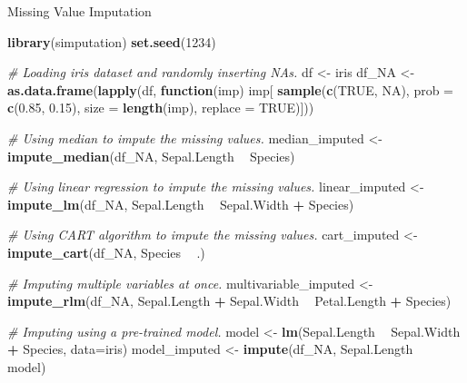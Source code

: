 \documentclass[12pt,ignorenonframetext,]{beamer}
\newenvironment{Shaded}{\begin{snugshade}}{\end{snugshade}}
\newcommand{\CommentTok}[1]{\textcolor[rgb]{0.56,0.35,0.01}{\textit{#1}}}
\newcommand{\ControlFlowTok}[1]{\textcolor[rgb]{0.13,0.29,0.53}{\textbf{#1}}}
\newcommand{\DataTypeTok}[1]{\textcolor[rgb]{0.13,0.29,0.53}{#1}}
\newcommand{\DecValTok}[1]{\textcolor[rgb]{0.00,0.00,0.81}{#1}}
\newcommand{\FloatTok}[1]{\textcolor[rgb]{0.00,0.00,0.81}{#1}}
\newcommand{\KeywordTok}[1]{\textcolor[rgb]{0.13,0.29,0.53}{\textbf{#1}}}
\newcommand{\NormalTok}[1]{#1}
\newcommand{\OperatorTok}[1]{\textcolor[rgb]{0.81,0.36,0.00}{\textbf{#1}}}
\newcommand{\OtherTok}[1]{\textcolor[rgb]{0.56,0.35,0.01}{#1}}
\newcommand{\StringTok}[1]{\textcolor[rgb]{0.31,0.60,0.02}{#1}}
\begin{document}
\begin{frame}[fragile]{Missing Value Imputation}
\protect\hypertarget{missing-value-imputation}{}

\tiny

\begin{Shaded}
\begin{Highlighting}[]
\KeywordTok{library}\NormalTok{(simputation)}
\KeywordTok{set.seed}\NormalTok{(}\DecValTok{1234}\NormalTok{)}

\CommentTok{# Loading iris dataset and randomly inserting NAs.}
\NormalTok{df <-}\StringTok{ }\NormalTok{iris}
\NormalTok{df_NA <-}\StringTok{ }\KeywordTok{as.data.frame}\NormalTok{(}\KeywordTok{lapply}\NormalTok{(df, }\ControlFlowTok{function}\NormalTok{(imp) imp[ }\KeywordTok{sample}\NormalTok{(}\KeywordTok{c}\NormalTok{(}\OtherTok{TRUE}\NormalTok{, }\OtherTok{NA}\NormalTok{), }
        \DataTypeTok{prob =} \KeywordTok{c}\NormalTok{(}\FloatTok{0.85}\NormalTok{, }\FloatTok{0.15}\NormalTok{), }\DataTypeTok{size =} \KeywordTok{length}\NormalTok{(imp), }\DataTypeTok{replace =} \OtherTok{TRUE}\NormalTok{)]))}

\CommentTok{# Using median to impute the missing values.}
\NormalTok{median_imputed <-}\StringTok{ }\KeywordTok{impute_median}\NormalTok{(df_NA, }
\NormalTok{                                Sepal.Length }\OperatorTok{~}\StringTok{ }\NormalTok{Species)}

\CommentTok{# Using linear regression to impute the missing values.}
\NormalTok{linear_imputed <-}\StringTok{ }\KeywordTok{impute_lm}\NormalTok{(df_NA, Sepal.Length }\OperatorTok{~}\StringTok{ }\NormalTok{Sepal.Width }\OperatorTok{+}\StringTok{ }\NormalTok{Species)}

\CommentTok{# Using CART algorithm to impute the missing values.}
\NormalTok{cart_imputed <-}\StringTok{ }\KeywordTok{impute_cart}\NormalTok{(df_NA, Species }\OperatorTok{~}\StringTok{ }\NormalTok{.)}

\CommentTok{# Imputing multiple variables at once.}
\NormalTok{multivariable_imputed <-}\StringTok{ }\KeywordTok{impute_rlm}\NormalTok{(df_NA, Sepal.Length }\OperatorTok{+}\StringTok{ }\NormalTok{Sepal.Width }
                                    \OperatorTok{~}\StringTok{ }\NormalTok{Petal.Length }\OperatorTok{+}\StringTok{ }\NormalTok{Species)}

\CommentTok{# Imputing using a pre-trained model.}
\NormalTok{model <-}\StringTok{ }\KeywordTok{lm}\NormalTok{(Sepal.Length }\OperatorTok{~}\StringTok{ }\NormalTok{Sepal.Width }\OperatorTok{+}\StringTok{ }\NormalTok{Species, }\DataTypeTok{data=}\NormalTok{iris)}
\NormalTok{model_imputed <-}\StringTok{ }\KeywordTok{impute}\NormalTok{(df_NA, Sepal.Length }\OperatorTok{~}\StringTok{ }\NormalTok{model)}
\end{Highlighting}
\end{Shaded}

\normalsize

\end{frame}
\end{document}
